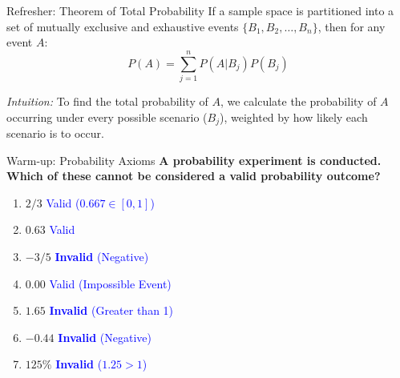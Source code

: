 \documentclass[aspectratio=169]{beamer}
\begin{document}
\begin{frame}{Refresher: Theorem of Total Probability}
    If a sample space is partitioned into a set of mutually exclusive and exhaustive events $\{B_1, B_2, \dots, B_n\}$, then for any event $A$:
    $$ P(A) = \sum_{j=1}^{n} P(A|B_j)P(B_j) $$
    
    \vspace{0.2cm}
    \textit{Intuition:} To find the total probability of $A$, we calculate the probability of $A$ occurring under every possible scenario ($B_j$), weighted by how likely each scenario is to occur.
\end{frame}

\begin{frame}{Warm-up: Probability Axioms}
    \textbf{A probability experiment is conducted. Which of these cannot be considered a valid probability outcome?}
    
    \begin{enumerate}
        \item $2/3$ \pause \hfill \textcolor{blue}{Valid ($0.667 \in [0,1]$)}
        \item $0.63$ \pause \hfill \textcolor{blue}{Valid}
        \item $-3/5$ \pause \hfill \textcolor{blue}{\textbf{Invalid} (Negative)}
        \item $0.00$ \pause \hfill \textcolor{blue}{Valid (Impossible Event)}
        \item $1.65$ \pause \hfill \textcolor{blue}{\textbf{Invalid} (Greater than 1)}
        \item $-0.44$ \pause \hfill \textcolor{blue}{\textbf{Invalid} (Negative)}
        \item $125\%$ \pause \hfill \textcolor{blue}{\textbf{Invalid} ($1.25 > 1$)}
    \end{enumerate}
\end{frame}
\end{document}

